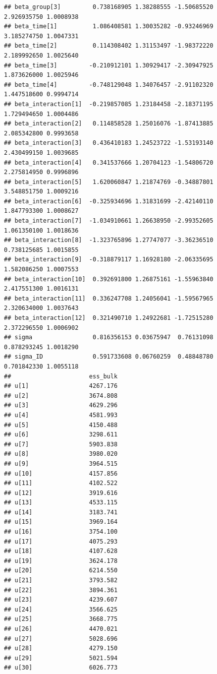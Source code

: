\documentclass[
]{article}
\begin{document}
\begin{verbatim}
## beta_group[3]         0.738168905 1.38288555 -1.50685520  2.926935750 1.0008938
## beta_time[1]          1.086408581 1.30035282 -0.93246969  3.185274750 1.0047331
## beta_time[2]          0.114308402 1.31153497 -1.98372220  2.189992650 1.0025640
## beta_time[3]         -0.210912101 1.30929417 -2.30947925  1.873626000 1.0025946
## beta_time[4]         -0.748129048 1.34076457 -2.91102320  1.447518600 0.9994714
## beta_interaction[1]  -0.219857085 1.23184458 -2.18371195  1.729494650 1.0004486
## beta_interaction[2]   0.114858528 1.25016076 -1.87413885  2.085342800 0.9993658
## beta_interaction[3]   0.436410183 1.24523722 -1.53193140  2.430499150 1.0039685
## beta_interaction[4]   0.341537666 1.20704123 -1.54806720  2.275814950 0.9996896
## beta_interaction[5]   1.620060847 1.21874769 -0.34887801  3.548851750 1.0009216
## beta_interaction[6]  -0.325934696 1.31831699 -2.42140110  1.847793300 1.0008627
## beta_interaction[7]  -1.034910661 1.26638950 -2.99352605  1.061350100 1.0018636
## beta_interaction[8]  -1.323765896 1.27747077 -3.36236510  0.738125685 1.0015855
## beta_interaction[9]  -0.318879117 1.16928180 -2.06335695  1.582086250 1.0007553
## beta_interaction[10]  0.392691800 1.26875161 -1.55963840  2.417551300 1.0016131
## beta_interaction[11]  0.336247708 1.24056041 -1.59567965  2.320634000 1.0037643
## beta_interaction[12]  0.321490710 1.24922681 -1.72515280  2.372296550 1.0006902
## sigma                 0.816356153 0.03675947  0.76131098  0.878293245 1.0018290
## sigma_ID              0.591733608 0.06760259  0.48848780  0.701842330 1.0055118
##                      ess_bulk
## u[1]                 4267.176
## u[2]                 3674.808
## u[3]                 4629.296
## u[4]                 4581.993
## u[5]                 4150.488
## u[6]                 3298.611
## u[7]                 5903.838
## u[8]                 3980.020
## u[9]                 3964.515
## u[10]                4157.856
## u[11]                4102.522
## u[12]                3919.616
## u[13]                4533.115
## u[14]                3183.741
## u[15]                3969.164
## u[16]                3754.100
## u[17]                4075.293
## u[18]                4107.628
## u[19]                3624.178
## u[20]                6214.550
## u[21]                3793.582
## u[22]                3894.361
## u[23]                4239.607
## u[24]                3566.625
## u[25]                3668.775
## u[26]                4470.021
## u[27]                5028.696
## u[28]                4279.150
## u[29]                5021.594
## u[30]                6026.773

\end{verbatim}
\end{document}
